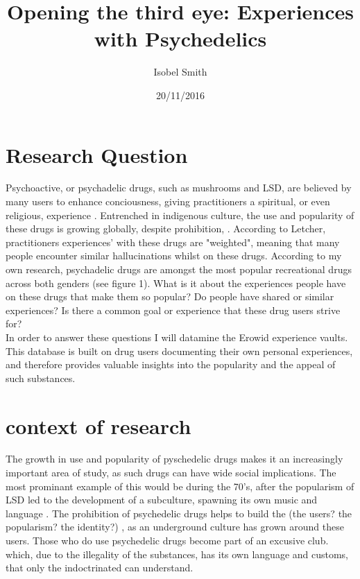 \documentclass{article}
\title{Opening the third eye: Experiences with Psychedelics}
\author{Isobel Smith}
\date{20/11/2016}
\begin{document}
\maketitle

\section{Research Question}

Psychoactive, or psychadelic drugs, such as mushrooms and LSD, are believed by many users to enhance conciousness, giving practitioners a spiritual, or even religious, experience \cite{letcher} \cite{watts}. Entrenched in indigenous culture, the use and popularity of these drugs is growing globally, despite prohibition, \cite{letcher} \cite{rager}. According to Letcher, practitioners experiences' with these drugs are "weighted", meaning that many people encounter similar hallucinations whilst on these drugs.  According to my own research, psychadelic drugs are amongst the most popular recreational drugs across both genders (see figure 1). What is it about the experiences people have on these drugs that make them so popular? Do people have shared or similar experiences? Is there a common goal or experience that these drug users strive for?\\

In order to answer these questions I will datamine the Erowid experience vaults. This database is built on drug users documenting their own personal experiences, and therefore provides valuable insights into the popularity and the appeal of such substances. 


\section{context of research}
The growth in use and popularity of pyschedelic drugs makes it an increasingly important area of study, as such drugs can have wide social implications. The most prominant example of this would be during the 70's, after the popularism of LSD led to the development of a subculture, spawning its own music and language \cite{letcher}. The prohibition of psychedelic drugs helps to build the (the users? the popularism? the identity?) , as an underground culture has grown around these users. Those who do use psychedelic drugs become part of an excusive club. which, due to the illegality of the substances, has its own language and customs, that only the indoctrinated can understand. \\
\end{document}
